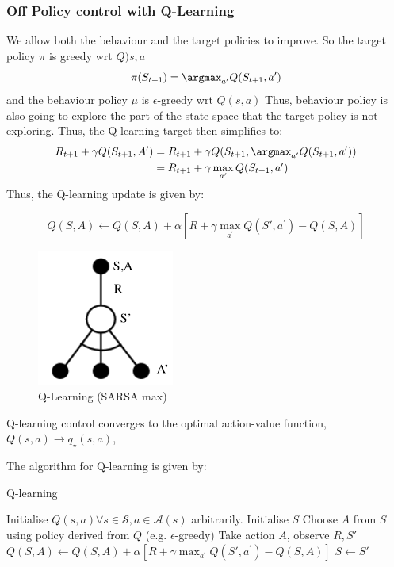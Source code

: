 \subsubsection{Off Policy control with Q-Learning}
We allow both the behaviour and the target policies to improve. So the target policy
\(\pi\) is greedy wrt \(Q)s,a\)
\[
  \pi(S_{t+1}) = \argmax_{a^{\prime}} Q(S_{t+1}, a^{\prime})
\]
and the behaviour policy \(\mu\) is \(\epsilon\)-greedy wrt \(Q(s,a)\)
Thus, behaviour policy is also going to explore the part of the state space that the target
policy is not exploring. Thus, the Q-learning target then simplifies to:
\[
  \begin{aligned}
    R_{t+1} + \gamma Q(S_{t+1}, A') &= R_{t+1} + \gamma Q(S_{t+1}, \argmax_{a^{\prime}}
    Q(S_{t+1}, a^{\prime})) \\
    &= R_{t+1} + \gamma \max_{a^{\prime}} Q(S_{t+1}, a^{\prime})  
  \end{aligned}
\]
Thus, the Q-learning update is given by:
\begin{figure}[H]
  \begin{minipage}{0.5\textwidth}
    \[
      Q(S,A) \leftarrow Q(S,A) + \alpha \left[ 
        R + \gamma \max_{a^{\prime}} Q(S', a^{\prime}) - Q(S,A)
      \right]
    \]
  \end{minipage}%
  \begin{minipage}{0.5\textwidth}
    \centering
    \includegraphics[width=0.4\textwidth]{figures/sarsamax.png}
    \caption{Q-Learning (SARSA max)}
    \label{fig:sarsamax}
  \end{minipage}
\end{figure}
\begin{theorem}
  Q-learning control converges to the optimal action-value function, \(Q(s,a) \to q_\star(s,a)\),
\end{theorem}
The algorithm for Q-learning is given by:
\begin{algorithm}[H]
  \caption{Q-learning}
  \label{alg:q-learning}
  \begin{algorithmic}[1]
    \State Initialise \(Q(s,a) \forall s \in \mathcal{S}, a \in \mathcal{A}(s)\) arbitrarily.
      \State Initialise \(S\)
        \State Choose \(A\) from \(S\) using policy derived from \(Q\) (e.g.
        \(\epsilon\)-greedy)
        \State Take action \(A\), observe \(R, S'\)
        \State \(Q(S,A) \leftarrow Q(S,A) + \alpha \left[ 
          R + \gamma \max_{a^{\prime}} Q(S', a^{\prime}) - Q(S,A)
        \right] \)
        \State \(S \leftarrow S'\)
      \EndFor
    \EndFor
  \end{algorithmic}
\end{algorithm}


